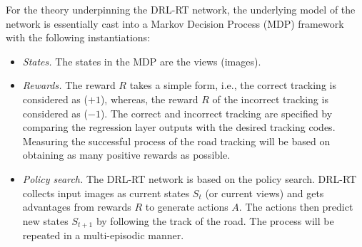 \documentclass{svproc}
\begin{document}
	
	For the theory underpinning the DRL-RT network, the underlying model of the network is essentially cast into a Markov Decision Process (MDP) framework with the following instantiations:
	\begin{itemize}
		\item \emph{States.} The states in the MDP are the views (images).  
		\item \emph{Rewards.} The reward $R$ takes a simple form, i.e., the correct tracking is considered as ($+1$), whereas, the reward $R$ of the incorrect tracking is considered as ($-1$). The correct and incorrect tracking are specified by comparing the regression layer outputs with the desired tracking codes. Measuring the successful process of the road tracking will be based on obtaining as many positive rewards as possible. 
		
		
		\item \emph{Policy search.} The DRL-RT network is based on the policy search. %
		DRL-RT collects input images as current states $S_t$ (or current views) and gets advantages from rewards $R$ to generate actions $A$. The actions then predict new states $S_{t+1}$ by following the track of the road. The process will be repeated in a multi-episodic manner.
		
	\end{itemize}
	
\end{document}
